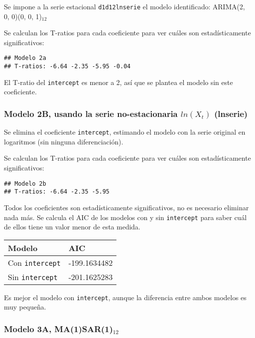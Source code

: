 \documentclass[
]{article}
\begin{document}
Se impone a la serie estacional \texttt{d1d12lnserie} el modelo
identificado: ARIMA(2, 0, 0)(0, 0, 1)\(_{12}\)

Se calculan los T-ratios para cada coeficiente para ver cuáles son
estadísticamente significativos:

\begin{verbatim}
## Modelo 2a 
## T-ratios: -6.64 -2.35 -5.95 -0.04
\end{verbatim}

El T-ratio del \texttt{intercept} es menor a 2, así que se plantea el
modelo sin este coeficiente.

\medskip

\hypertarget{modelo-2b-usando-la-serie-no-estacionaria-lnx_t-lnserie}{%
\subsubsection{\texorpdfstring{Modelo 2B, usando la serie
no-estacionaria \(ln(X_t)\)
(lnserie)}{Modelo 2B, usando la serie no-estacionaria ln(X\_t) (lnserie)}}\label{modelo-2b-usando-la-serie-no-estacionaria-lnx_t-lnserie}}

Se elimina el coeficiente \texttt{intercept}, estimando el modelo con la
serie original en logaritmos (sin ninguna diferenciación).

Se calculan los T-ratios para cada coeficiente para ver cuáles son
estadísticamente significativos:

\begin{verbatim}
## Modelo 2b 
## T-ratios: -6.64 -2.35 -5.95
\end{verbatim}

Todos los coeficientes son estadísticamente significativos, no es
necesario eliminar nada más. Se calcula el AIC de los modelos con y sin
\texttt{intercept} para saber cuál de ellos tiene un valor menor de esta
medida.

\begin{longtable}[]{@{}ll@{}}
\toprule()
Modelo & AIC \\
\midrule()
\endhead
Con \texttt{intercept} & -199.1634482 \\
Sin \texttt{intercept} & -201.1625283 \\
\bottomrule()
\end{longtable}

Es mejor el modelo con \texttt{intercept}, aunque la diferencia entre
ambos modelos es muy pequeña.

\medskip

\hypertarget{modelo-3a-ma1sar1_12}{%
\subsubsection{\texorpdfstring{Modelo 3A,
MA(1)SAR(1)\(_{12}\)}{Modelo 3A, MA(1)SAR(1)\_\{12\}}}\label{modelo-3a-ma1sar1_12}}
\end{document}
